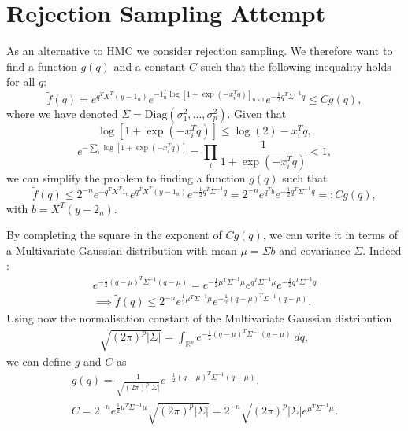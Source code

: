 \documentclass[a4paper, 12pt,oneside]{article}
\begin{document}
		\section{Rejection Sampling Attempt}\label{appendix:rejection-sampling-attempt}
		As an alternative to HMC we consider rejection sampling. We therefore want to find a function $g(q)$ and a constant $C$ such that the following inequality holds for all $q$:
		\begin{equation}
			\tilde{f}(q) = e^{q^TX^T(y-1_{n})}e^{-1_{n}^T \log[1+\exp(-x_i^Tq)]_{n\times 1}}e^{-\frac{1}{2}q^T\Sigma^{-1} q} \leq Cg(q),
		\end{equation}
		where we have denoted $\Sigma=\text{Diag}(\sigma_1^2,...,\sigma_p^2)$.
		Given that 
		\begin{equation}
			\log[1+\exp(-x_i^Tq)] \le \log(2) - x_i^Tq,
		\end{equation}
		\begin{equation}
			e^{-\sum_i \log[1+\exp(-x_i^Tq)]} = \prod_i \frac{1}{1+\exp(-x_i^Tq)}<1,
		\end{equation}
		we can simplify the problem to finding a function $g(q)$ such that
		\begin{equation}
			\tilde{f}(q) \le 2^{-n}e^{-q^TX^T 1_n} e^{q^TX^T(y-1_{n})}e^{-\frac{1}{2}q^T\Sigma^{-1} q} = 2^{-n}e^{q^Tb}e^{-\frac{1}{2}q^T\Sigma^{-1} q}
			=: Cg(q),
		\end{equation}
		with $b=X^T(y-2_{n})$. 
	
		By completing the square in the exponent of $Cg(q)$, we can write it in terms of a Multivariate Gaussian distribution with mean $\mu=\Sigma b$ and covariance $\Sigma$. Indeed : 
		\begin{gather}
			e^{-\frac{1}{2}(q-\mu)^T\Sigma^{-1} (q-\mu)} =
			e^{-\frac{1}{2}\mu^T\Sigma^{-1}\mu}
			e^{q^T\Sigma^{-1}\mu}
			e^{-\frac{1}{2}q^T\Sigma^{-1} q} \\
			\implies \tilde{f}(q) \le 2^{-n}e^{\frac{1}{2}\mu^T\Sigma^{-1} \mu}e^{-\frac{1}{2}(q-\mu)^T\Sigma^{-1}(q-\mu)}.
		\end{gather}
		Using now the normalisation constant of the Multivariate Gaussian distribution 
		\begin{gather}
			\sqrt{(2\pi)^p|\Sigma|}=\int_{\mathbb{R}^p}e^{-\frac{1}{2}(q-\mu)^T\Sigma^{-1}(q-\mu)}\ dq,
		\end{gather} 
		we can define $g$ and $C$ as 
		\begin{gather}
			g(q)=\frac{1}{\sqrt{(2\pi)^p|\Sigma|}}e^{-\frac{1}{2}(q-\mu)^T\Sigma^{-1}(q-\mu)}, \\
			C = 2^{-n}e^{\frac{1}{2}\mu^T\Sigma^{-1} \mu}{\sqrt{(2\pi)^p|\Sigma|}} = 2^{-n}\sqrt{(2\pi)^p|\Sigma|e^{\mu^T\Sigma^{-1} \mu}}.
		\end{gather} 
\end{document}
